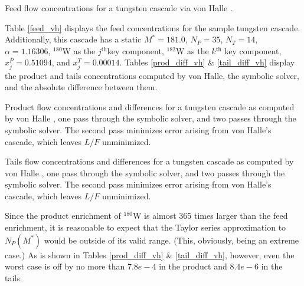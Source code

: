 \documentclass[preprint,12pt]{elsarticle}
\newcommand{\superscript}[1]{\ensuremath{^{\textrm{#1}}}}
\newcommand{\nuc}[2]{\superscript{#2}{#1}}
\newcommand{\jth}[0]{$j$\superscript{th}}
\newcommand{\kth}[0]{$k$\superscript{th}}
\begin{document}
\begin{table}[htbp]
\begin{center}
\caption{Feed flow concentrations for a tungsten cascade via von Halle 
\cite{VonHalle1987}.}

\end{center}
\label{feed_vh}
\end{table}

Table \ref{feed_vh} displays the feed concentrations for the sample tungsten cascade.
Additionally, this cascade has a static $M^*=181.0$, $N_P=35$, $N_T=14$,
$\alpha=1.16306$, \nuc{W}{180} as the \jth key component, \nuc{W}{182} as the \kth
key component, $x_j^P=0.51094$, and $x_j^T=0.00014$.  Tables \ref{prod_diff_vh} \&
\ref{tail_diff_vh} display the product and tails concentrations computed by von Halle, 
the symbolic solver, and the absolute difference between them.

\begin{table}[htbp]
\begin{center}
\caption{Product flow concentrations and differences for a tungsten cascade as 
computed by  von Halle \cite{VonHalle1987}, one pass through the symbolic solver, 
and two passes through the symbolic solver.  The second pass minimizes error arising
from von Halle's cascade, which leaves $L/F$ unminimized.}

\end{center}
\label{prod_diff_vh}
\end{table}

\begin{table}[htbp]
\begin{center}
\caption{Tails flow concentrations and differences for a tungsten cascade as 
computed by  von Halle \cite{VonHalle1987}, one pass through the symbolic solver, 
and two passes through the symbolic solver.  The second pass minimizes error arising 
from von Halle's cascade, which leaves $L/F$ unminimized.}

\end{center}
\label{tail_diff_vh}
\end{table}

Since the product enrichment of \nuc{W}{180} is almost 365 times larger than the feed
enrichment, it is reasonable to expect that the Taylor series approximation to 
$N_P(M^*)$ would be outside of its valid range.  (This, obviously, being an extreme
case.)  As is shown in Tables \ref{prod_diff_vh} \& \ref{tail_diff_vh}, however, 
even the worst case is off by no more than $7.8e-4$ in the product and $8.4e-6$ in the
tails.  
\end{document}
